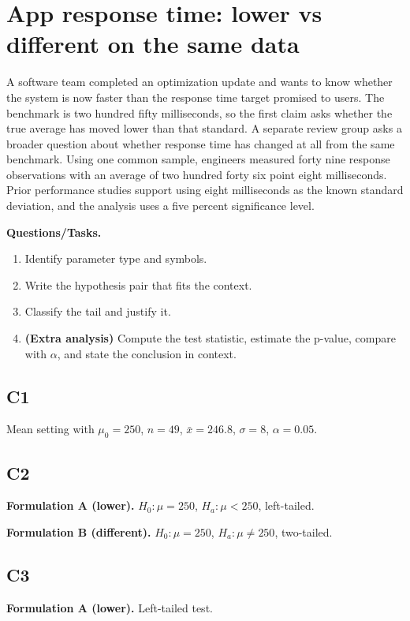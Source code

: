\section{App response time: lower vs different on the same data}
A software team completed an optimization update and wants to know whether the system is now faster than the response time target promised to users. The benchmark is two hundred fifty milliseconds, so the first claim asks whether the true average has moved lower than that standard. A separate review group asks a broader question about whether response time has changed at all from the same benchmark. Using one common sample, engineers measured forty nine response observations with an average of two hundred forty six point eight milliseconds. Prior performance studies support using eight milliseconds as the known standard deviation, and the analysis uses a five percent significance level.

\textbf{Questions/Tasks.}
\begin{enumerate}
    \item[(C1)] Identify parameter type and symbols.
    \item[(C2)] Write the hypothesis pair that fits the context.
    \item[(C3)] Classify the tail and justify it.
    \item[(EA)] \textbf{(Extra analysis)} Compute the test statistic, estimate the p-value, compare with \(\alpha\), and state the conclusion in context.
\end{enumerate}

\subsection*{C1}
Mean setting with \(\mu_0=250\), \(n=49\), \(\bar{x}=246.8\), \(\sigma=8\), \(\alpha=0.05\).

\subsection*{C2}
\textbf{Formulation A (lower).}
\(H_0:\mu=250\), \(H_a:\mu<250\), left-tailed.

\textbf{Formulation B (different).}
\(H_0:\mu=250\), \(H_a:\mu\ne 250\), two-tailed.

\subsection*{C3}
\textbf{Formulation A (lower).} Left-tailed test. \LeftTailGraph

